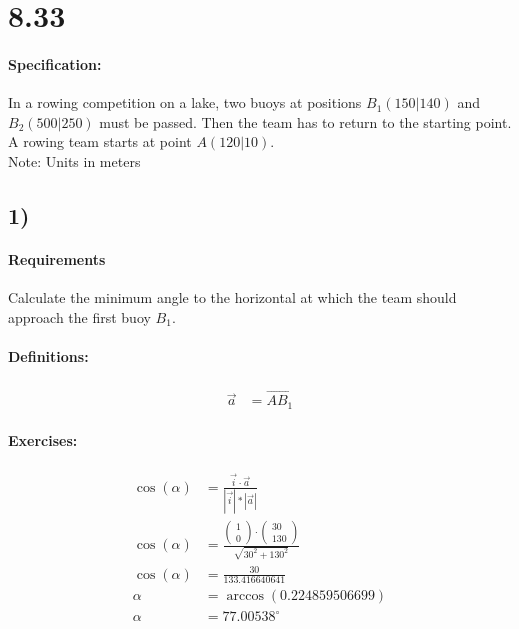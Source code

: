 \section{8.33}
\paragraph{Specification:}
In a rowing competition on a lake, two buoys at positions $B_1(150|140)$ and $B_2(500|250)$ 
must be passed. Then the team has to return to the starting point. A rowing team starts at 
point $A(120|10)$. \\
Note: Units in meters

\subsection{1)}
\paragraph{Requirements}
Calculate the minimum angle to the horizontal at which the team should approach the first 
buoy $B_1$. 


\def\va{\begin{pmatrix}
    30 \\ 
    130
\end{pmatrix}}
\def\vb{\begin{pmatrix}
    350 \\ 
    110
\end{pmatrix}}

\paragraph{Definitions:}
\begin{align}
    \vec{a} &= \vec{AB_1}
\end{align}

\paragraph{Exercises:}
\begin{align}
    \cos(\alpha) &= \frac{\vec{i} \cdot \vec{a}}{|\vec{i}| * |\vec{a}|}  \\
    \cos(\alpha) &= \frac{\begin{pmatrix}
       1 \\ 
       0
    \end{pmatrix} 
    \cdot \va}{\sqrt{30^2 + 130^2}}  \\
    \cos(\alpha) &= \frac{30}{133.416640641} \\
    \alpha &= \arccos(0.224859506699) \\
    \alpha &= 77.00538^\circ
\end{align}

